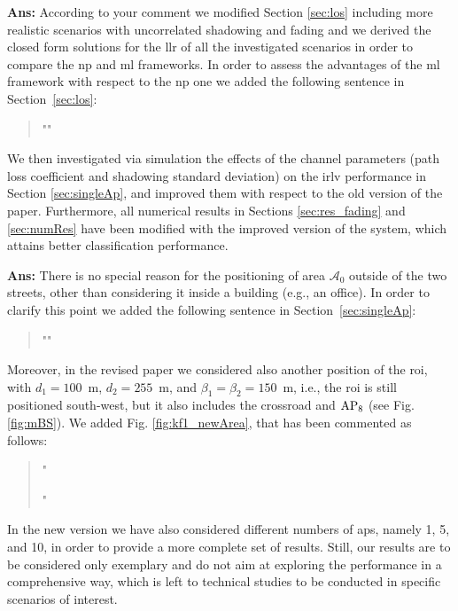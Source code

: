 \documentclass[draftcls,onecolumn,12pt]{IEEEtran}
\newcounter{revc}
\newcommand{\revp}[1]{\zref[revcontent]{#1}}
\begin{document}
{\bf Ans:} According to your comment we modified Section \ref{sec:los} including more realistic scenarios with uncorrelated shadowing and fading and we derived the closed form solutions for the \ac{llr} of all the investigated scenarios in order to compare the \ac{np} and \ac{ml} frameworks. In order to assess the advantages of the \ac{ml} framework with respect to the \ac{np} one we added the following sentence in Section~\ref{sec:los}:
\begin{quote}
"\revp{llrComp}"
\end{quote}
We then investigated via simulation the effects of the channel parameters (path loss coefficient and shadowing standard deviation) on the \ac{irlv} performance in Section \ref{sec:singleAp}, and improved them with respect to the old version of the paper. Furthermore, all numerical results in Sections \ref{sec:res_fading} and \ref{sec:numRes} have been modified with the improved version of the system, which attains better classification performance.



\vspace{5mm} %
\begin{framed}
\end{framed}

{\bf Ans:} There is no special reason for the positioning of area $\mathcal A_0$ outside of the two streets, other than considering it inside a building (e.g., an office). In order to clarify this point we added the following sentence in Section~\ref{sec:singleAp}:
\begin{quote}
"\revp{building}"
\end{quote}

Moreover, in the revised paper we considered also another position of the \ac{roi}, with $d_1 = 100$~m, $d_2 = 255$~m, and $\beta_1 = \beta_2 = 150$~m, i.e., the \ac{roi}  is still positioned south-west, but it also includes the crossroad and $\rm AP_8$ (see Fig. \ref{fig:mBS}). We added Fig. \ref{fig:kf1_newArea}, that has been commented as follows:
\begin{quote}
"\revp{revnewarea}

\revp{newarea2}"
\end{quote}
In the new version we have also considered different numbers of \acp{ap}, namely 1, 5, and 10, in order to provide a more complete set of results. Still, our results are to be considered only exemplary and do not aim at exploring the performance in a comprehensive way, which is left to technical studies to be conducted in specific scenarios of interest.
\end{document}
